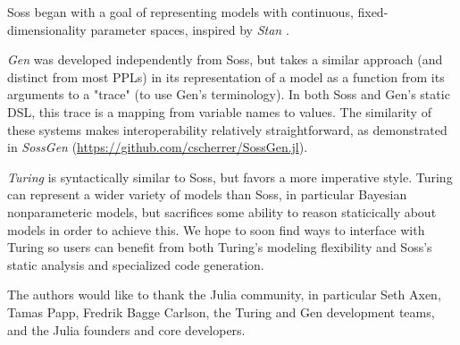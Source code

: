 \documentclass[anonymous=false, %
               format=acmsmall, %
               review=true, %
               screen=true, %
               nonacm=true]{acmart}
\begin{document}
Soss began with a goal of representing models with continuous, fixed-dimensionality parameter spaces, inspired by \emph{Stan} \cite{stan:2017}.

\emph{Gen} \cite{Cusumano-Towner:2019} was developed independently from Soss, but takes a similar approach (and distinct from most PPLs) in its representation of a model as a function from its arguments to a "trace" (to use Gen's terminology). In both Soss and Gen's static DSL, this trace is a mapping from variable names to values. The similarity of these systems makes interoperability relatively straightforward, as demonstrated in \emph{SossGen} (\url{https://github.com/cscherrer/SossGen.jl}). 

\emph{Turing} \cite{ge2018t} is syntactically similar to Soss, but favors a more imperative style. Turing can represent a wider variety of models than Soss, in particular Bayesian nonparameteric models, but sacrifices some ability to reason staticically about models in order to achieve this. We hope to soon find ways to interface with Turing so users can benefit from both Turing's modeling flexibility and Soss's static analysis and specialized code generation.

\begin{acks}
The authors would like to thank the Julia community, in particular Seth Axen, Tamas Papp, Fredrik Bagge Carlson, the Turing and Gen development teams, and the Julia founders and core developers. 
\end{acks}




\appendix

\end{document}
